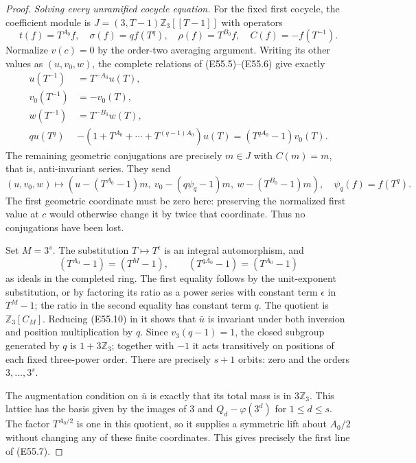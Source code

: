 \begin{proof}
\emph{Solving every unramified cocycle equation.}
For the fixed first cocycle, the coefficient module is
$J=(3,T-1)\mathbb Z_3[[T-1]]$ with operators
\[
 t(f)=T^{A_0}f,\quad
 \sigma(f)=qf(T^q),\quad
 \rho(f)=T^{B_0}f,\quad C(f)=-f(T^{-1}).                   \tag{E55.9}
\]
Normalize $v(c)=0$ by the order-two averaging argument.
Writing its other values as $(u,v_0,w)$, the complete
relations of (E55.5)--(E55.6) give exactly
\[
 \begin{split}
 u(T^{-1})&=T^{-A_0}u(T),\\
 v_0(T^{-1})&=-v_0(T),\\
 w(T^{-1})&=T^{-B_0}w(T),\\
 q u(T^q)&-(1+T^{A_0}+\cdots+T^{(q-1)A_0})u(T)
                                      =(T^{qA_0}-1)v_0(T).
 \end{split}                                                \tag{E55.10}
\]
The remaining geometric conjugations are precisely
$m\in J$ with $C(m)=m$, that is, anti-invariant series.
They send
\[
 (u,v_0,w)\longmapsto
 (u-(T^{A_0}-1)m,\ v_0-(q\psi_q-1)m,
                         \ w-(T^{B_0}-1)m),
 \quad\psi_q(f)=f(T^q).                                    \tag{E55.11}
\]
The first geometric coordinate must be zero here: preserving
the normalized first value at $c$ would otherwise change it
by twice that coordinate. Thus no conjugations have been lost.

Set $M=3^s$. The substitution $T\mapsto T^\epsilon$ is an
integral automorphism, and
\[
 (T^{A_0}-1)=(T^M-1),\qquad
 (T^{qA_0}-1)=(T^{A_0}-1)                                  \tag{E55.12}
\]
as ideals in the completed ring. The first equality follows
by the unit-exponent substitution, or by factoring its ratio
as a power series with constant term $\epsilon$ in $T^M-1$;
the ratio in the second equality has constant term $q$.
The quotient is $\mathbb Z_3[C_M]$. Reducing (E55.10) in it
shows that $\bar u$ is invariant under both inversion and
position multiplication by $q$. Since $v_3(q-1)=1$, the
closed subgroup generated by $q$ is $1+3\mathbb Z_3$;
together with $-1$ it acts transitively on positions of
each fixed three-power order. There are precisely $s+1$
orbits: zero and the orders $3,\ldots,3^s$.

The augmentation condition on $\bar u$ is exactly that its
total mass is in $3\mathbb Z_3$. This lattice has the basis
given by the images of $3$ and
$Q_d-\varphi(3^d)$ for $1\le d\le s$.
The factor $T^{A_0/2}$ is one in this quotient, so it
supplies a symmetric lift about $A_0/2$ without changing
any of these finite coordinates. This gives precisely
the first line of (E55.7).


\end{proof}
